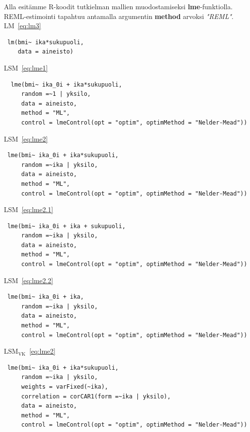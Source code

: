 \documentclass[finnish]{docopts}
\begin{document}
Alla esitämme R-koodit tutkielman mallien muodostamiseksi \textbf{lme}-funktiolla. REML-estimointi tapahtuu antamalla argumentin \textbf{method} arvoksi \textit{"REML"}.\\ 

LM~\ref{eq:lm3} \\

\begin{lstlisting}
 lm(bmi~ ika*sukupuoli,
    data = aineisto)
\end{lstlisting}

LSM~\ref{eq:lme1}\\

\begin{lstlisting}
  lme(bmi~ ika_0i + ika*sukupuoli,
     random =~1 | yksilo,
     data = aineisto,
     method = "ML",
     control = lmeControl(opt = "optim", optimMethod = "Nelder-Mead"))
\end{lstlisting}

LSM~\ref{eq:lme2}\\

\begin{lstlisting}
 lme(bmi~ ika_0i + ika*sukupuoli,
     random =~ika | yksilo,
     data = aineisto,
     method = "ML",
     control = lmeControl(opt = "optim", optimMethod = "Nelder-Mead"))
\end{lstlisting}

LSM~\ref{eq:lme2.1}\\

\begin{lstlisting}
 lme(bmi~ ika_0i + ika + sukupuoli,
     random =~ika | yksilo,
     data = aineisto,
     method = "ML",
     control = lmeControl(opt = "optim", optimMethod = "Nelder-Mead"))
\end{lstlisting}

LSM~\ref{eq:lme2.2}\\

\begin{lstlisting}
 lme(bmi~ ika_0i + ika,
     random =~ika | yksilo,
     data = aineisto,
     method = "ML",
     control = lmeControl(opt = "optim", optimMethod = "Nelder-Mead"))
\end{lstlisting}

$\text{LSM}_{\text{VK}}$~\ref{eq:lme2}\\

\begin{lstlisting}
 lme(bmi~ ika_0i + ika*sukupuoli,
     random =~ika | yksilo,
     weights = varFixed(~ika),
     correlation = corCAR1(form =~ika | yksilo),
     data = aineisto,
     method = "ML",
     control = lmeControl(opt = "optim", optimMethod = "Nelder-Mead"))
\end{lstlisting}
\end{document}
